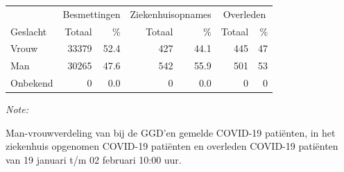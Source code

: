 \documentclass[
  english,
  man,floatsintext]{apa6}
\begin{document}
\begin{table}[H]
\centering\begingroup\fontsize{11}{13}\selectfont

\begin{threeparttable}
\begin{tabular}{lrrrrrr}
\toprule
\multicolumn{1}{c}{ } & \multicolumn{2}{c}{Besmettingen} & \multicolumn{2}{c}{Ziekenhuisopnames} & \multicolumn{2}{c}{Overleden} \\
\cmidrule(l{3pt}r{3pt}){2-3} \cmidrule(l{3pt}r{3pt}){4-5} \cmidrule(l{3pt}r{3pt}){6-7}
Geslacht & Totaal & \% & Totaal & \% & Totaal & \%\\
\midrule
Vrouw & 33379 & 52.4 & 427 & 44.1 & 445 & 47\\
Man & 30265 & 47.6 & 542 & 55.9 & 501 & 53\\
Onbekend & 0 & 0.0 & 0 & 0.0 & 0 & 0\\
\bottomrule
\end{tabular}
\begin{tablenotes}
\item \textit{Note: } 
\item Man-vrouwverdeling van bij de GGD’en gemelde COVID-19 patiënten, in het ziekenhuis opgenomen COVID-19 patiënten en overleden COVID-19 patiënten van 19 januari t/m 02 februari 10:00 uur.
\end{tablenotes}
\end{threeparttable}
\endgroup{}
\end{table}
\newpage
\end{document}
